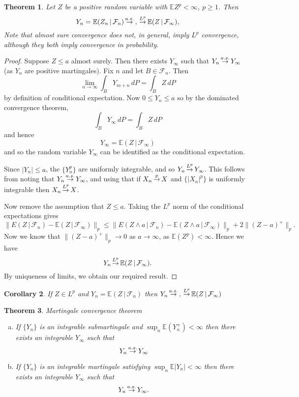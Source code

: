 \documentclass[10pt, oneside, reqno]{amsart}
\theoremstyle{plain}%
\newtheorem{thm}{Theorem}[section]
\newtheorem{cor}[thm]{Corollary}
\theoremstyle{definition}
\theoremstyle{remark}
\newcommand{\given}{ \, | \,}
\newcommand{\sigf}{\mathcal{F}}
\newcommand{\E}{\mathbb{E}}
\def\cip{\,{\buildrel p \over \rightarrow}\,}
\def\cas{\,{\buildrel a.s. \over \rightarrow}\,}
\def\clp{\,{\buildrel L^p \over \rightarrow}\,}
\begin{document}
\begin{thm}
	Let $Z$ be a positive random variable with $\E Z^p < \infty$, $p \geq 1$. Then \[
		Y_n = \E(Z_n \given \sigf_n) \cas, \clp \E(Z \given \sigf_\infty), 
	\]  Note that almost sure convergence does not, in general, imply $L^p$ convergence, although they both imply convergence in probability.  
\end{thm}
\begin{proof}
	Suppose $Z \leq a$ almost surely.  Then there exists $Y_\infty$ such that $Y_n \cas Y_\infty$ (as $Y_n$ are positive martingales).  Fix $n$ and let $B \in \sigf_n$.  Then \[
		\lim_{n \rightarrow \infty} \int_B Y_{m+n} \, dP = \int_B Z \, dP
	\] by definition of conditional expectation.  Now $0 \leq Y_n \leq a$ so by the dominated convergence theorem, \[
		\int_B Y_\infty \, dP = \int_B Z \, dP
	\] and hence \[
		Y_\infty = \E(Z \given \sigf_\infty)
	\] and so the random variable $Y_\infty$ can be identified as the conditional expectation.  
	
	Since $|Y_n| \leq a$, the $\{ Y_n^p \}$ are uniformly integrable, and so $Y_n \clp Y_\infty$.  This follows from noting that $Y_n \cas Y_\infty$, and using that if $X_n \cip X$ and $\{ |X_n|^p \}$ is uniformly integrable then $X_n \clp X$.  
	
	Now remove the assumption that $Z \leq a$. Taking the $L^p$ norm of the conditional expectations gives \[
		\| E(Z \given \sigf_n) - \E(Z \given \sigf_\infty) \|_p \leq \| E(Z \wedge a \given \sigf_n) - \E(Z \wedge a \given \sigf_\infty) \|_p + 2 \| (Z - a)^+ \|_p.
	\]  Now we know that $\|(Z -a)^+\|_p \rightarrow 0$ as $a \rightarrow \infty$, as $\E(Z^p) < \infty$.  Hence we have \[
		Y_n \clp \E(Z \given \sigf_\infty).
	\]  By uniqueness of limits, we obtain our required result.  
\end{proof}
\begin{cor}
	If $Z \in L^p$ and $Y_n = \E(Z \given \sigf_n)$ then $Y_n \cas, \clp \E(Z \given \sigf_\infty)$
\end{cor}

\begin{thm}{Martingale convergence theorem}{\ }
	\begin{enumerate}[(a)]
		\item 
		If $\{ Y_n \}$ is an integrable submartingale and $\sup_{n} \E(Y_n^+) < \infty$ then there exists an integrable $Y_\infty$ such that \[
		Y_n \cas Y_\infty
		\]  
		\item
		If $\{ Y_n \}$ is an integrable martingale satisfying $\sup_n \E |Y_n| < \infty$ then there exists an integrable $Y_\infty$ such that \[
			Y_n \cas Y_\infty.
		\]
	\end{enumerate}
\end{thm}
\end{document}
